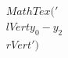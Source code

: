 \documentclass[preview]{standalone}
\begin{document}
\begin{align*}
MathTex('\\lVert y_0 - y_2 \\rVert')
\end{align*}
\end{document}
